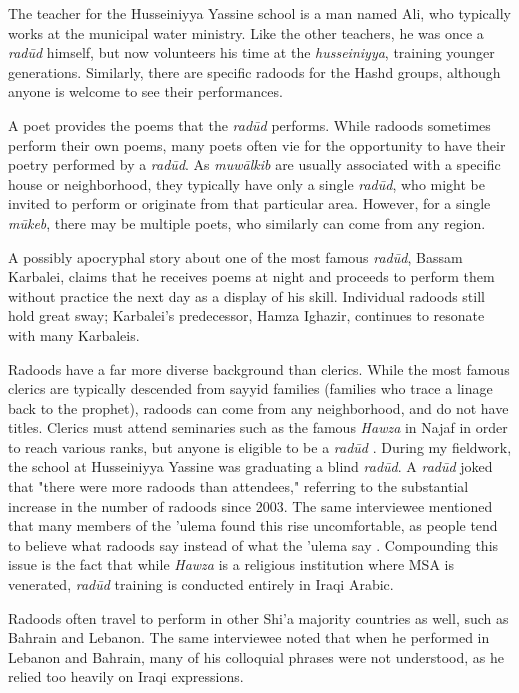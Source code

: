 The teacher for the Husseiniyya Yassine school is a man named Ali, who typically works at the municipal water ministry. Like the other teachers, he was once a \emph{radūd} himself, but now volunteers his time at the \emph{husseiniyya}, training younger generations. Similarly, there are specific radoods for the Hashd groups, although anyone is welcome to see their performances. 

A poet provides the poems that the \emph{radūd} performs. While radoods sometimes perform their own poems, many poets often vie for the opportunity to have their poetry performed by a \emph{radūd}. As \emph{muwālkib} are usually associated with a specific house or neighborhood, they typically have only a single \emph{radūd}, who might be invited to perform or originate from that particular area. However, for a single \emph{mūkeb}, there may be multiple poets, who similarly can come from any region. 

A possibly apocryphal story about one of the most famous \emph{radūd}, Bassam Karbalei, claims that he receives poems at night and proceeds to perform them without practice the next day as a display of his skill\cite{al-husseini_interview_2022}. Individual radoods still hold great sway; Karbalei's predecessor, Hamza Ighazir, continues to resonate with many Karbaleis. 

Radoods have a far more diverse background than clerics. While the most famous clerics are typically descended from sayyid families (families who trace a linage back to the prophet), radoods can come from any neighborhood, and do not have titles. Clerics must attend seminaries such as the famous \emph{Hawza} in Najaf in order to reach various ranks, but anyone is eligible to be a \emph{radūd} \cite{al-husseini_interview_2022}. During my fieldwork, the school at Husseiniyya Yassine was graduating a blind \emph{radūd}. A \emph{radūd} joked that "there were more radoods than attendees," referring to the substantial increase in the number of radoods since 2003. The same interviewee mentioned that many members of the 'ulema found this rise uncomfortable, as people tend to believe what radoods say instead of what the 'ulema say \cite{al-husseini_interview_2022}. Compounding this issue is the fact that while \emph{Hawza} is a religious institution where MSA is venerated, \emph{radūd} training is conducted entirely in Iraqi Arabic. 

Radoods often travel to perform in other Shi'a majority countries as well, such as Bahrain and Lebanon. The same interviewee noted that when he performed in Lebanon and Bahrain, many of his colloquial phrases were not understood, as he relied too heavily on Iraqi expressions.

